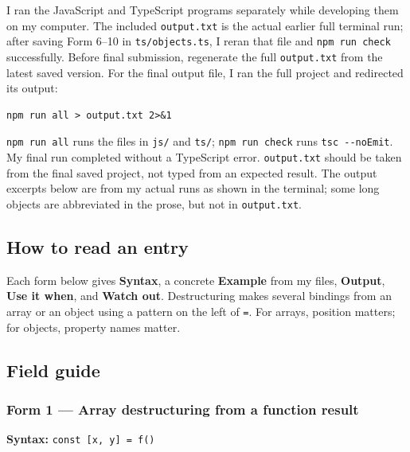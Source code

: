 \documentclass[
  9pt,
]{article}
\newcommand{\passthrough}[1]{#1}
\begin{document}
I ran the JavaScript and TypeScript programs separately while developing
them on my computer. The included \passthrough{\lstinline!output.txt!}
is the actual earlier full terminal run; after saving Form 6--10 in
\passthrough{\lstinline!ts/objects.ts!}, I reran that file and
\passthrough{\lstinline!npm run check!} successfully. Before final
submission, regenerate the full \passthrough{\lstinline!output.txt!}
from the latest saved version. For the final output file, I ran the full
project and redirected its output:

\begin{lstlisting}
npm run all > output.txt 2>&1
\end{lstlisting}

\passthrough{\lstinline!npm run all!} runs the files in
\passthrough{\lstinline!js/!} and \passthrough{\lstinline!ts/!};
\passthrough{\lstinline!npm run check!} runs
\passthrough{\lstinline!tsc --noEmit!}. My final run completed without a
TypeScript error. \passthrough{\lstinline!output.txt!} should be taken
from the final saved project, not typed from an expected result. The
output excerpts below are from my actual runs as shown in the terminal;
some long objects are abbreviated in the prose, but not in
\passthrough{\lstinline!output.txt!}.

\subsection{How to read an entry}\label{how-to-read-an-entry}

Each form below gives \textbf{Syntax}, a concrete \textbf{Example} from
my files, \textbf{Output}, \textbf{Use it when}, and \textbf{Watch out}.
Destructuring makes several bindings from an array or an object using a
pattern on the left of \passthrough{\lstinline!=!}. For arrays, position
matters; for objects, property names matter.

\subsection{Field guide}\label{field-guide}

\subsubsection{Form 1 --- Array destructuring from a function
result}\label{form-1-array-destructuring-from-a-function-result}

\textbf{Syntax:} \passthrough{\lstinline!const [x, y] = f()!}
\end{document}
